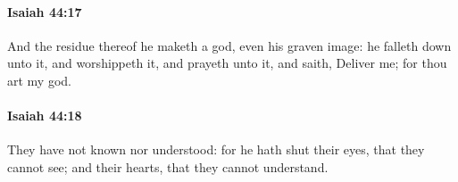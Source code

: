 		\paragraph{Isaiah 44:17} %
			\label{ISAIAH-44-17}

			And the residue thereof he maketh a god, even his graven image: he falleth down unto it, and worshippeth it, and prayeth unto it, and saith, Deliver me; for thou art my god.


		\paragraph{Isaiah 44:18} %
			\label{ISAIAH-44-18}

			They have not known nor understood: for he hath shut their eyes, that they cannot see; and their hearts, that they cannot understand.


